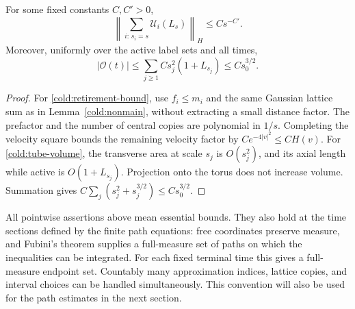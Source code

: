\begin{lemma}
\label{cold:retirement-size}
For some fixed constants \(C,C'>0\),
\begin{equation}
 \left\|\sum_{i:\,s_i=s}\mathcal U_i(L_s)\right\|_H
       \le C s^{-C'}.
 \label{cold:retirement-bound}
\end{equation}
Moreover, uniformly over the active label sets and all times,
\begin{equation}
 |\mathcal O(t)|\le\sum_{j\ge1}C s_j^2(1+L_{s_j})
                    \le C s_0^{3/2}.
 \label{cold:tube-volume}
\end{equation}
\end{lemma}
\begin{proof}
For \eqref{cold:retirement-bound}, use \(f_i\le m_i\) and the same
Gaussian lattice sum as in Lemma~\ref{cold:nonmain}, without extracting
a small distance factor.  The prefactor and the number of central
copies are polynomial in \(1/s\).  Completing the velocity square
bounds the remaining velocity factor by \(Ce^{-4|v|^2}\le CH(v)\).
For \eqref{cold:tube-volume}, the transverse area at scale \(s_j\)
is \(O(s_j^2)\), and its axial length while active is
\(O(1+L_{s_j})\).  Projection onto the torus does not increase volume.
Summation gives \(C\sum_j(s_j^2+s_j^{3/2})\le Cs_0^{3/2}\).
\end{proof}

All pointwise assertions above mean essential bounds.  They also hold
at the time sections defined by the finite path equations: free
coordinates preserve measure, and Fubini's theorem supplies a
full-measure set of paths on which the inequalities can be integrated.
For each fixed terminal time this gives a full-measure endpoint set.
Countably many approximation indices, lattice copies, and interval
choices can be handled simultaneously.  This convention will also be
used for the path estimates in the next section.
